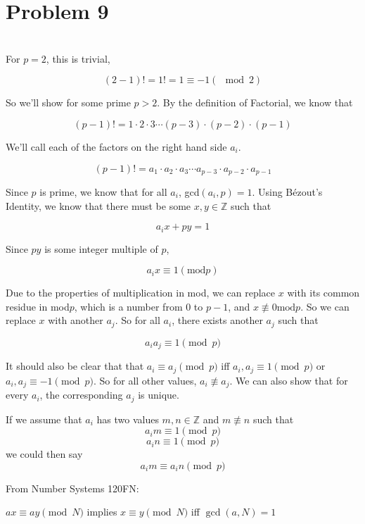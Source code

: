 \documentclass[12pt]{article}
\newcommand{\Z}{\mathbb{Z}}
\begin{document}
\section*{Problem 9}
\\

For $p=2$, this is trivial,

\[(2-1)! = 1! = 1 \equiv -1 (\mod 2)\]

So we'll show for some prime $p>2$. By the definition of Factorial, we know that 

\[(p-1)! = 1 \cdot 2 \cdot 3 \cdots (p-3) \cdot (p-2) \cdot (p-1)\]

We'll call each of the factors on the right hand side $a_i$.

\[(p-1)! = a_1 \cdot a_2 \cdot a_3 \cdots a_{p-3} \cdot a_{p-2} \cdot a_{p-1}\]

Since $p$ is prime, we know that for all $a_i$, gcd$(a_i, p) = 1$. Using B\'ezout's Identity, we know that there must be some $x,y \in \Z$ such that

\[a_ix + py = 1\]

Since $py$ is some integer multiple of $p$,

\[a_ix \equiv 1 (\text{mod}p)\]

Due to the properties of multiplication in mod, we can replace $x$ with its common residue in mod$p$, which is a number from 0 to $p-1$, and $x \not \equiv 0 \text{mod}p$. So we can replace $x$ with another $a_j$. So for all $a_i$, there exists another $a_j$ such that

\[a_ia_j \equiv 1 \pmod{p}\]

It should also be clear that that $a_i \equiv a_j \pmod{p}$ iff $a_i,a_j \equiv 1 \pmod{p}$ or\\ $a_i,a_j \equiv -1 \pmod{p}$. So for all other values, $a_i \not \equiv a_j$. We can also show that for every $a_i$, the corresponding $a_j$ is unique.

If we assume that $a_i$ has two values $m,n \in \Z$ and $m \not \equiv n$ such that 
\[a_im \equiv 1\pmod{p}\]
\[a_in \equiv 1\pmod{p}\]
we could then say
\[a_im \equiv a_in\pmod{p}\]

From Number Systems 120FN:
\begin{center}
   $ax \equiv ay \pmod{N}$ implies $x \equiv y \pmod{N}$ iff $\gcd(a, N)=1$ 
\end{center}
\end{document}
